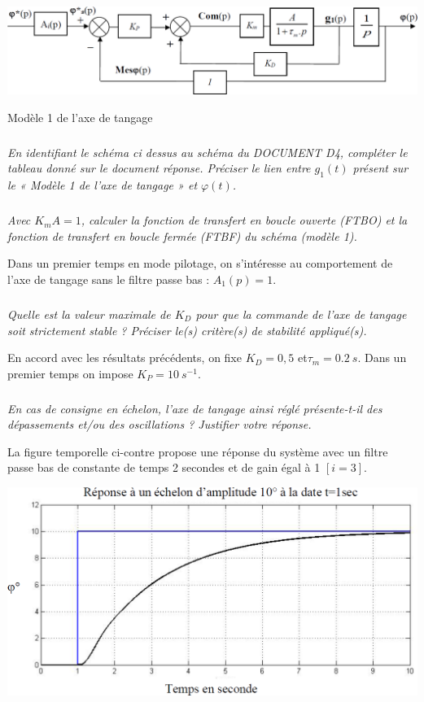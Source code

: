 \documentclass[10pt,fleqn]{article} %
\begin{document}
\begin{center}
\includegraphics[width=\linewidth]{fig_c}

Modèle 1 de l'axe de tangage
\end{center}


\subparagraph{\label{q22}}\textit{En identifiant le schéma ci dessus au schéma du DOCUMENT D4, compléter le tableau donné sur le document réponse. Préciser le lien entre $g_1(t)$ présent sur le « Modèle 1 de l’axe de tangage » et $\varphi(t)$. }

\subparagraph{\label{q23}}\textit{Avec $K_m A = 1$,  calculer la fonction de transfert en boucle ouverte (FTBO) et la fonction de transfert en boucle fermée (FTBF) du schéma (modèle 1).}

Dans un premier temps en mode pilotage, on s’intéresse au comportement de l’axe de tangage sans le filtre passe bas : $A_1(p)=1$. 

\subparagraph{\label{q24}}\textit{Quelle est la valeur maximale de $K_D$ pour que la commande de l’axe de tangage soit strictement stable ? Préciser le(s) critère(s) de stabilité appliqué(s).}

En accord avec les résultats précédents, on fixe $K_D = 0,5$ et$\tau_m=\SI{0,2}{s}$.
Dans un premier temps on impose  $K_P = \SI{10}{s^{-1}}$.

\subparagraph{\label{q25}}\textit{En cas de consigne en échelon, l’axe de tangage ainsi réglé présente-t-il des dépassements et/ou des oscillations ? Justifier votre réponse.}


La figure temporelle ci-contre propose une réponse du système avec un filtre passe bas de constante de temps 2 secondes et de gain égal à 1 $[i=3]$.

\begin{center}
\includegraphics[width=.5\linewidth]{fig_d}

\end{center}
\end{document}
